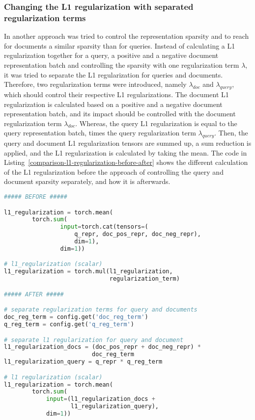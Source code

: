 \subsubsection*{Changing the L1 regularization with separated regularization terms}
In another approach was tried to control the representation sparsity and to reach for documents a similar
    sparsity than for queries.
Instead of calculating a L1 regularization together for a query, a positive and a negative document 
    representation batch and controlling the sparsity with one regularization term $\lambda$,
    it was tried to separate the L1 regularization for queries and documents.
Therefore, two regularization terms were introduced, namely $\lambda_{doc}$ and $\lambda_{query}$,
    which should control their respective L1 regularizations.
The document L1 regularization is calculated based on a positive and a negative document representation batch,
    and its impact should be controlled with the document regularization term $\lambda_{doc}$.
Whereas, the query L1 regularization is equal to the query representation batch, times the 
    query regularization term $\lambda_{query}$.
Then, the query and document L1 regularization tensors are summed up, a sum reduction is applied,
    and the L1 regularization is calculated by taking the mean.
The code in Listing~\ref{comparison-l1-regularization-before-after} shows the different calculation of the L1 regularization before the approach
    of controlling the query and document sparsity separately, and how it is afterwards.

\begin{lstlisting}[language=Python,frame=single,breaklines=true,float=tbh,caption=Comparison of the L1 regularization calculation before and after separating it on query and documents,label=comparison-l1-regularization-before-after]
##### BEFORE #####

l1_regularization = torch.mean(
        torch.sum(
                input=torch.cat(tensors=(
                    q_repr, doc_pos_repr, doc_neg_repr),
                    dim=1), 
                dim=1))

# l1_regularization (scalar)
l1_regularization = torch.mul(l1_regularization, 
                              regularization_term)

##### AFTER #####

# separate regularization terms for query and documents
doc_reg_term = config.get('doc_reg_term') 
q_reg_term = config.get('q_reg_term')

# separate l1 regularization for query and document
l1_regularization_docs = (doc_pos_repr + doc_neg_repr) * 
                         doc_reg_term 
l1_regularization_query = q_repr * q_reg_term

# l1 regularization (scalar)
l1_regularization = torch.mean(
        torch.sum(
            input=(l1_regularization_docs + 
                   l1_regularization_query), 
            dim=1))
\end{lstlisting}

